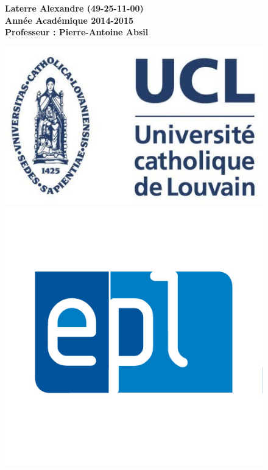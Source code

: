 \begin{titlepage}
\begin{figure}[b]
\centering
\textbf{\large Laterre Alexandre (49-25-11-00)} \\
\textbf{\large Année Académique 2014-2015} \\
\textbf{\large Professeur : Pierre-Antoine Absil} \\
\begin{minipage}{0.2\linewidth}
	\includegraphics[scale=0.2]{images/logo_ucl.jpg}
\end{minipage} \hspace{-10pt}
\begin{minipage}{0.2\linewidth}
\centering
    \includegraphics[scale=0.2]{images/logo_epl.jpg}
\end{minipage}
\end{figure}
\end{titlepage}
\restoregeometry
